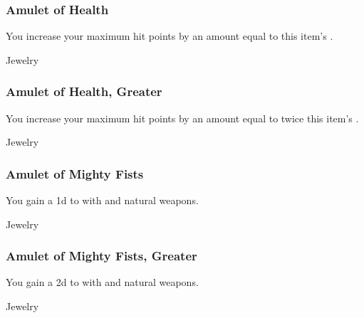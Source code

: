 
\lowercase{\hypertarget{item:Amulet of Health}{}}\label{item:Amulet of Health}
\hypertarget{item:Amulet of Health}{\subsubsection{Amulet of Health\hfill{}}}

You increase your maximum hit points by an amount equal to this item's .



 Jewelry


\lowercase{\hypertarget{item:Amulet of Health, Greater}{}}\label{item:Amulet of Health, Greater}
\hypertarget{item:Amulet of Health, Greater}{\subsubsection{Amulet of Health, Greater\hfill{}}}

You increase your maximum hit points by an amount equal to twice this item's .



 Jewelry


\lowercase{\hypertarget{item:Amulet of Mighty Fists}{}}\label{item:Amulet of Mighty Fists}
\hypertarget{item:Amulet of Mighty Fists}{\subsubsection{Amulet of Mighty Fists\hfill{}}}

You gain a \plus1d  to  with  and natural weapons.



 Jewelry


\lowercase{\hypertarget{item:Amulet of Mighty Fists, Greater}{}}\label{item:Amulet of Mighty Fists, Greater}
\hypertarget{item:Amulet of Mighty Fists, Greater}{\subsubsection{Amulet of Mighty Fists, Greater\hfill{}}}

You gain a \plus2d  to  with  and natural weapons.



 Jewelry


